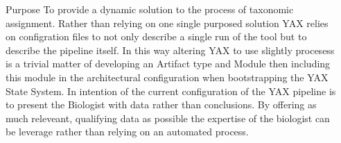 \documentclass[final,t]{beamer}
\begin{document}
\begin{frame}{}
\begin{columns}[t]
\begin{column}{.3\linewidth}
    \end{column}
    \begin{column}{.3\linewidth}
        \begin{block}{Purpose}
            To provide a dynamic solution to the process of taxonomic assignment. Rather than relying on one single purposed solution
            YAX relies on configration files to not only describe a single run of the tool but to describe the pipeline itself. In this
            way altering YAX to use slightly procesess is a trivial matter of developing an Artifact type and Module then including this
            module in the architectural configuration when bootstrapping the YAX State System. In intention of the current configuration
            of the YAX pipeline is to present the Biologist with data rather than conclusions. By offering as much releveant, qualifying
            data as possible the expertise of the biologist can be leverage rather than relying on an automated process.
        \end{block}


\end{column}
\end{columns}
\end{frame}
\end{document}
